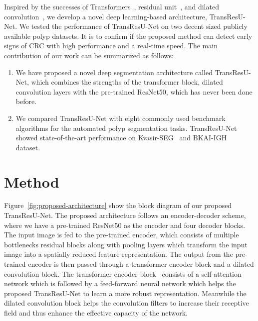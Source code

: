 \documentclass[conference]{IEEEtran}
\begin{document}
Inspired by the successes of Transformers~\cite{demir2022transformer}, residual unit~\cite{he2016deep},  and dilated convolution~\cite{yu2015multi}, we develop a novel deep learning-based architecture, TransResU-Net. We tested the performance of TransResU-Net on two decent sized publicly available polyp datasets. It is to confirm if the proposed method can detect early signs of \ac{CRC} with high performance and a real-time speed. The main contribution of our work can be summarized as follows: 
\begin{enumerate}
    \item We have proposed a novel deep segmentation architecture called TransResU-Net, which combines the strengths of the  transformer block, dilated convolution layers with the pre-trained ResNet50, which has never been done before. 
    
    \item We compared TransResU-Net with eight commonly used benchmark algorithms for the automated polyp segmentation tasks. TransResU-Net showed state-of-the-art performance on Kvasir-SEG~\cite{jha2020kvasir} and BKAI-IGH~\cite{lan2021neounet} dataset. 
\end{enumerate}



\section{Method}
\vspace{-1mm}
Figure~\ref{fig:proposed-architecture} show the block diagram of our proposed TransResU-Net. The proposed architecture follows an encoder-decoder scheme, where we have a pre-trained ResNet50 as the encoder and four decoder blocks. The input image is fed to the pre-trained encoder, which consists of multiple bottlenecks residual blocks along with pooling layers which transform the input image into a spatially reduced feature representation. The output from the pre-trained encoder is then passed through a transformer encoder block and a dilated convolution block. The transformer encoder block~\cite{vaswani2017attention} consists of a self-attention network which is followed by a feed-forward neural network which helps the proposed TransResU-Net to learn a more robust representation. Meanwhile the dilated convolution block helps the convolution filters to increase their receptive field and thus enhance the effective capacity of the network. 
\end{document}
